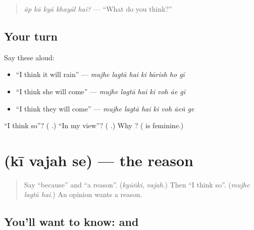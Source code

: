 \begin{quote}
\textbf{    }
\end{quote}

\begin{quote}
\emph{āp kā kyā khayāl hai?} — \textquotedblleft{}What do you think?\textquotedblright{}
\end{quote}

\subsection*{Your turn}
Say these aloud:

\begin{itemize}
\raggedright
  \item \textquotedblleft{}I think it will rain\textquotedblright{} — \emph{mujhe lagtā hai ki bārish ho gī}
  \item \textquotedblleft{}I think she will come\textquotedblright{} — \emph{mujhe lagtā hai ki voh āe gī}
  \item \textquotedblleft{}I think they will come\textquotedblright{} — \emph{mujhe lagtā hai ki voh āeṅ ge}
\end{itemize}

\begin{tcolorbox}[breakable,colback=teal!4,colframe=teal!35!black,title={Before you move on}]
\textquotedblleft{}I think so\textquotedblright{}? (\textbf{  }.) \textquotedblleft{}In my view\textquotedblright{}? (\textbf{  }.) Why \textbf{ }? (\textbf{} is feminine.)
\end{tcolorbox}
\section[\texorpdfstring{\ur{کی} \ur{وجہ} \ur{سے} (kī vajah se)}{کی وجہ سے (kī vajah se)}]{   (kī vajah se) — the reason}

\label{lesson:UR-C268-ki-vajah-se}



\begin{quote}
Say \textquotedblleft{}because\textquotedblright{} and \textquotedblleft{}a reason\textquotedblright{}. (\emph{kyūṅki}, \emph{vajah}.) Then \textquotedblleft{}I think so\textquotedblright{}. (\emph{mujhe lagtā hai}.) An opinion wants a reason.
\end{quote}

\subsection*{You'll want to know:  and }
\begin{quote}
\textbf{  }
\end{quote}

